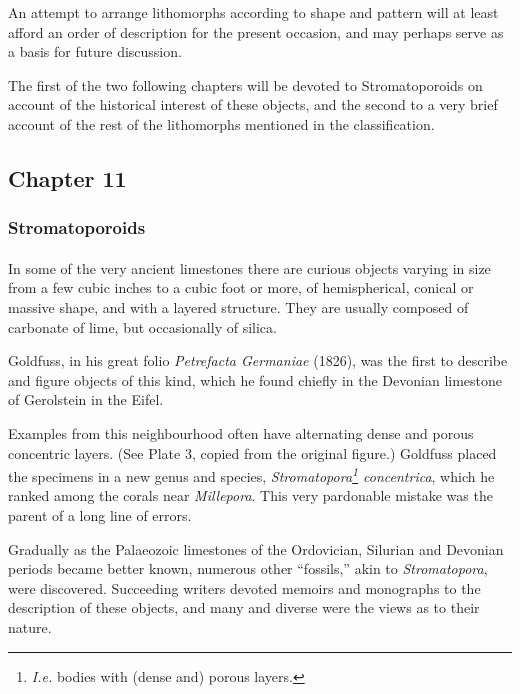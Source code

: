 \documentclass[a4paper, 12pt, oneside, landscape]{article}
\begin{document}
An attempt to arrange lithomorphs according to shape and pattern will at least afford an order of description for the present occasion, and may perhaps serve as a basis for future discussion.

The first of the two following chapters will be devoted to Stromatoporoids on account of the historical interest of these objects, and the second to a very brief account of the rest of the lithomorphs mentioned in the classification.
\clearpage
\subsection{Chapter 11}
\subsubsection{Stromatoporoids}
\paragraph{}
In some of the very ancient limestones there are curious objects varying in size from a few cubic inches to a cubic foot or more, of hemispherical, conical or massive shape, and with a layered structure. They are usually composed of carbonate of lime, but occasionally of silica.

Goldfuss, in his great folio \emph{Petrefacta Germaniae} (1826), was the first to describe and figure objects of this kind, which he found chiefly in the Devonian limestone of Gerolstein in the Eifel.

Examples from this neighbourhood often have alternating dense and porous concentric layers. (See Plate 3, copied from the original figure.) Goldfuss placed the specimens in a new genus and species, \emph{Stromatopora\footnote{\emph{I.e.} bodies with (dense and) porous layers.} concentrica}, which he ranked among the corals near \emph{Millepora}. This very pardonable mistake was the parent of a long line of errors.

Gradually as the Palaeozoic limestones of the Ordovician, Silurian and Devonian periods became better known, numerous other ``fossils,'' akin to \emph{Stromatopora}, were discovered. Succeeding writers devoted memoirs and monographs to the description of these objects, and many and diverse were the views as to their nature.
\end{document}
